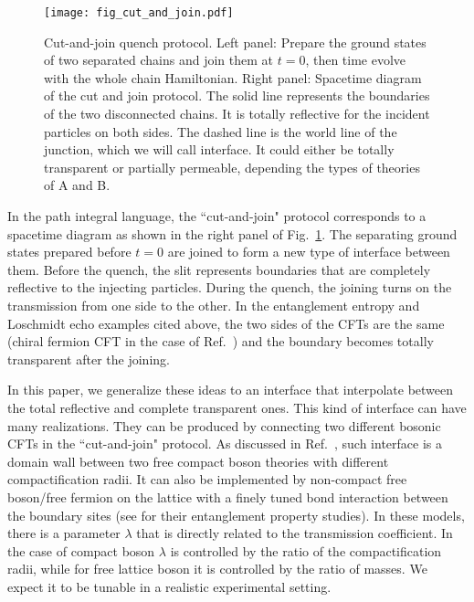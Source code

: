 \begin{figure}[h]
\texttt{[image: fig\_cut\_and\_join.pdf]}
\caption{Cut-and-join quench protocol. Left panel: Prepare the ground states of two separated chains and join them at $t = 0$, then time evolve with the whole chain Hamiltonian. Right panel: Spacetime diagram of the cut and join protocol. The solid line represents the boundaries of the two disconnected chains. It is totally reflective for the incident particles on both sides. The dashed line is the world line of the junction, which we will call interface. It could either be totally transparent or partially permeable, depending the types of theories of A and B.}
\label{fig:cut-and-join}
\end{figure}

In the path integral language, the ``cut-and-join" protocol corresponds to a spacetime diagram as shown in the right panel of Fig.~\ref{fig:cut-and-join}. The separating ground states prepared before $t = 0$ are joined to form a new type of interface between them. Before the quench, the slit represents boundaries that are completely reflective to the injecting particles. During the quench, the joining turns on the transmission from one side to the other. In the entanglement entropy and Loschmidt echo examples cited above\cite{calabrese_entanglement_2007, calabrese_quantum_2016, vasseur_universal_2014}, the two sides of the CFTs are the same (chiral fermion CFT in the case of Ref.~) and the boundary becomes totally transparent after the joining. 

In this paper, we generalize these ideas to an interface that interpolate between the total reflective and complete transparent ones. This kind of interface can have many realizations. They can be produced by connecting two different bosonic CFTs in the ``cut-and-join" protocol. As discussed in Ref.~, such interface is a domain wall between two free compact boson theories with different compactification radii. It can also be implemented by non-compact free boson/free fermion on the lattice with a finely tuned bond interaction between the boundary sites (see  for their entanglement property studies). In these models, there is a parameter $\lambda$ that is directly related to the transmission coefficient. In the case of compact boson $\lambda$ is controlled by the ratio of the compactification radii, while for free lattice boson it is controlled by the ratio of masses. We expect it to be tunable in a realistic experimental setting.

